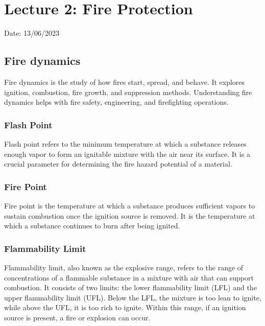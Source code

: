 \documentclass{article}
\begin{document}
\newpage

\section{Lecture 2: Fire Protection}
\hfill Date: 13/06/2023

\subsection*{Fire dynamics}
Fire dynamics is the study of how fires start, spread, and behave. It explores ignition, combustion, fire growth, and suppression methods. Understanding fire dynamics helps with fire safety, engineering, and firefighting operations.

\subsubsection*{Flash Point}
Flash point refers to the minimum temperature at which a substance releases enough vapor to form an ignitable mixture with the air near its surface. It is a crucial parameter for determining the fire hazard potential of a material.

\subsubsection*{Fire Point}
Fire point is the temperature at which a substance produces sufficient vapors to sustain combustion once the ignition source is removed. It is the temperature at which a substance continues to burn after being ignited.

\subsubsection*{Flammability Limit}
Flammability limit, also known as the explosive range, refers to the range of concentrations of a flammable substance in a mixture with air that can support combustion. It consists of two limits: the lower flammability limit (LFL) and the upper flammability limit (UFL). Below the LFL, the mixture is too lean to ignite, while above the UFL, it is too rich to ignite. Within this range, if an ignition source is present, a fire or explosion can occur.
\end{document}

